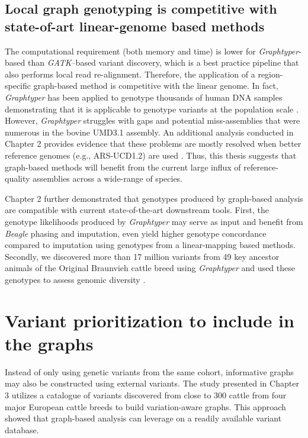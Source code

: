 \documentclass[../main.tex]{subfiles}
\begin{document}
\subsection*{Local graph genotyping is competitive with state-of-art linear-genome based methods}

The computational requirement (both memory and time) is lower for \emph{Graphtyper}-based than \emph{GATK}–based variant discovery, which is a best practice pipeline that also performs local read re-alignment. Therefore, the application of a region-specific graph-based method is competitive with the linear genome. In fact, \emph{Graphtyper} has been applied to genotype thousands of human DNA samples demonstrating that it is applicable to genotype variants at the population scale \citep{eggertsson2017graphtyper,eggertsson2019graphtyper2}. However, \emph{Graphtyper} struggles with gaps and potential miss-assemblies that were numerous in the bovine UMD3.1 assembly. An additional analysis conducted in Chapter 2 provides evidence that these problems are mostly resolved when better reference genomes (e.g., ARS-UCD1.2) are used \citep{rosen2020novo}. Thus, this thesis suggests that graph-based methods will benefit from the current large influx of reference-quality assemblies across a wide-range of species. 

Chapter 2 further demonstrated that genotypes produced by graph-based analysis are compatible with current state-of-the-art downstream tools. First, the genotype likelihoods produced by \emph{Graphtyper }may serve as input and benefit from \emph{Beagle} phasing and imputation, even yield higher genotype concordance compared to imputation using genotypes from a linear-mapping based methods. Secondly, we discovered more than 17 million variants from 49 key ancestor animals of the Original Braunvieh cattle breed using \emph{Graphtyper} and used these genotypes to assess genomic diversity \citep{bhati2020assessing}. 

\section{Variant prioritization to include in the graphs}

Instead of only using genetic variants from the same cohort, informative graphs may also be constructed using external variants. The study presented in Chapter 3 utilizes a catalogue of variants discovered from close to 300 cattle from four major European cattle breeds to build variation-aware graphs. This approach showed that graph-based analysis can leverage on a readily available variant database. 
\end{document}
